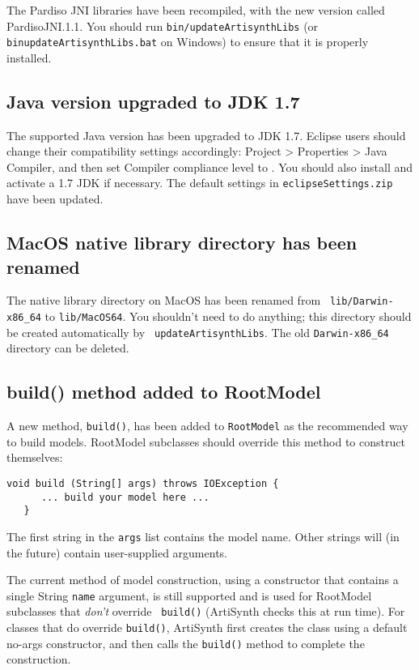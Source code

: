 \documentclass{article}
\begin{document}
The Pardiso JNI libraries have been recompiled, with the new version
called PardisoJNI.1.1. You should run {\tt bin/updateArtisynthLibs} (or
{\tt bin\BKS updateArtisynthLibs.bat} on Windows) to ensure that it is
properly installed.

\subsection*{Java version upgraded to JDK 1.7}

The supported Java version has been upgraded to JDK 1.7. Eclipse users
should change their compatibility settings accordingly: {\sf Project >
Properties > Java Compiler}, and then set {\sf Compiler compliance
level} to {}. You should also install and activate a 1.7 JDK if
necessary.  The default settings in {\tt eclipseSettings.zip} have
been updated.

\subsection*{MacOS native library directory has been renamed}

The native library directory on MacOS has been renamed from {\tt
lib/Darwin-x86\_64} to {\tt lib/MacOS64}. You shouldn't need to do
anything; this directory should be created automatically by {\tt
updateArtisynthLibs}. The old {\tt Darwin-x86\_64} directory can be
deleted.

\subsection*{build() method added to RootModel}

A new method, {\tt build()}, has been added to {\tt RootModel} as the
recommended way to build models. RootModel subclasses should override this
method to construct themselves:
\begin{lstlisting}[]
   void build (String[] args) throws IOException {
      ... build your model here ...
   }
\end{lstlisting}
The first string in the {\tt args} list contains the model name. Other
strings will (in the future) contain user-supplied arguments.

The current method of model construction, using a constructor that
contains a single String {\tt name} argument, is still supported and
is used for RootModel subclasses that {\it don't} override {\tt
build()} (ArtiSynth checks this at run time). For classes that do
override {\tt build()}, ArtiSynth first creates the class using a
default no-args constructor, and then calls the {\tt build()} method
to complete the construction.
\end{document}
